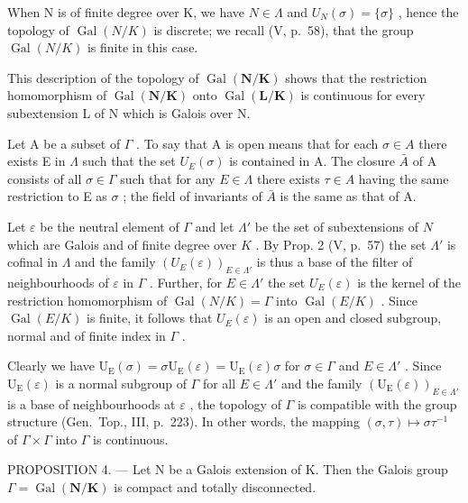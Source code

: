 When N is of finite degree over K, we have \(N \in \Lambda\) and \(U_{N}(\sigma) = \{\sigma\}\) , hence the topology of \(\operatorname{Gal}(N/K)\) is discrete; we recall (V, p.~58), that the group \(\operatorname{Gal}(N/K)\) is finite in this case.

This description of the topology of \(\operatorname{Gal}(\mathbf{N}/\mathbf{K})\) shows that the restriction homomorphism of \(\operatorname{Gal}(\mathbf{N}/\mathbf{K})\) onto \(\operatorname{Gal}(\mathbf{L}/\mathbf{K})\) is continuous for every subextension L of N which is Galois over N.

Let A be a subset of \(\Gamma\) . To say that A is open means that for each \(\sigma\in A\) there exists E in \(\Lambda\) such that the set \(U_{E}(\sigma)\) is contained in A. The closure \(\bar{A}\) of A consists of all \(\sigma\in\Gamma\) such that for any \(E\in\Lambda\) there exists \(\tau\in A\) having the same restriction to E as \(\sigma\) ; the field of invariants of \(\bar{A}\) is the same as that of A.

Let \(\varepsilon\) be the neutral element of \(\Gamma\) and let \(\Lambda'\) be the set of subextensions of \(N\) which are Galois and of finite degree over \(K\) . By Prop. 2 (V, p.~57) the set \(\Lambda'\) is cofinal in \(\Lambda\) and the family \((U_E(\varepsilon))_{E \in \Lambda'}\) is thus a base of the filter of neighbourhoods of \(\varepsilon\) in \(\Gamma\) . Further, for \(E \in \Lambda'\) the set \(U_E(\varepsilon)\) is the kernel of the restriction homomorphism of \(\operatorname{Gal}(N/K) = \Gamma\) into \(\operatorname{Gal}(E/K)\) . Since \(\operatorname{Gal}(E/K)\) is finite, it follows that \(U_E(\varepsilon)\) is an open and closed subgroup, normal and of finite index in \(\Gamma\) .

Clearly we have \(\mathrm{U}_{\mathrm{E}}(\sigma)=\sigma\mathrm{U}_{\mathrm{E}}(\varepsilon)=\mathrm{U}_{\mathrm{E}}(\varepsilon)\sigma\) for \(\sigma\in\Gamma\) and \(E\in\Lambda'\) . Since \(\mathrm{U}_{\mathrm{E}}(\varepsilon)\) is a normal subgroup of \(\Gamma\) for all \(E\in\Lambda'\) and the family \((\mathrm{U}_{\mathrm{E}}(\varepsilon))_{E\in\Lambda'}\) is a base of neighbourhoods at \(\varepsilon\) , the topology of \(\Gamma\) is compatible with the group structure (Gen.~Top., III, p.~223). In other words, the mapping \((\sigma,\tau)\mapsto\sigma\tau^{-1}\) of \(\Gamma\times\Gamma\) into \(\Gamma\) is continuous.

PROPOSITION 4. --- Let N be a Galois extension of K. Then the Galois group \(\Gamma = \operatorname{Gal}(\mathbf{N}/\mathbf{K})\) is compact and totally disconnected.

